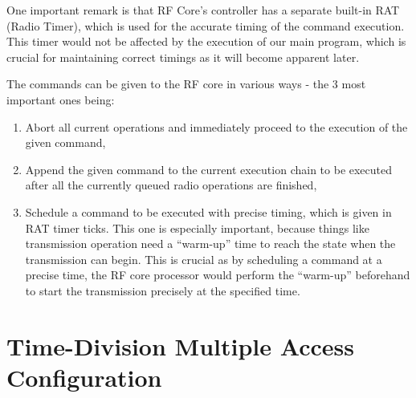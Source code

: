 One important remark is that RF Core’s controller has a separate built-in RAT (Radio Timer), which is used for the accurate timing of the command execution. This timer would not be affected by the execution of our main program, which is crucial for maintaining correct timings as it will become apparent later.

The commands can be given to the RF core in various ways - the 3 most important ones being:

\begin{enumerate}[nolistsep]
\item Abort all current operations and immediately proceed to the execution of the given command,
\item Append the given command to the current execution chain to be executed after all the currently queued radio operations are finished,
\item Schedule a command to be executed with precise timing, which is given in RAT timer ticks. This one is especially important, because things like transmission operation need a “warm-up” time to reach the state when the transmission can begin. This is crucial as by scheduling a command at a precise time, the RF core processor would perform the “warm-up” beforehand to start the transmission precisely at the specified time.
\end{enumerate}

\section{Time-Division Multiple Access Configuration}

